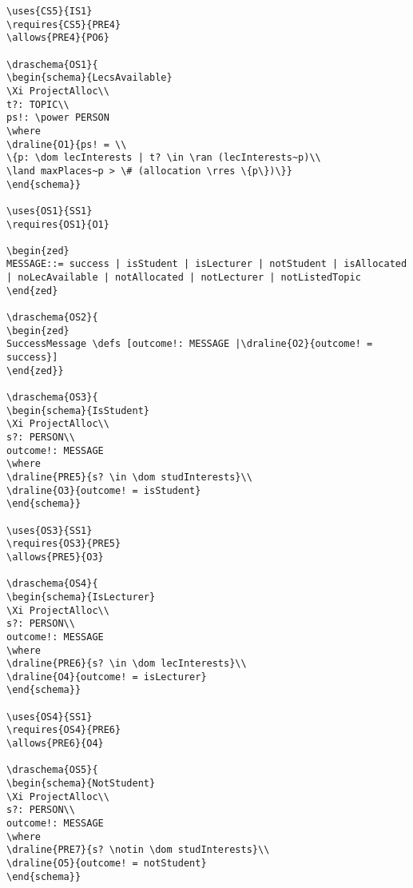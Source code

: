 \begin{verbatim}
\uses{CS5}{IS1}
\requires{CS5}{PRE4}
\allows{PRE4}{PO6}

\draschema{OS1}{
\begin{schema}{LecsAvailable}
\Xi ProjectAlloc\\
t?: TOPIC\\
ps!: \power PERSON
\where
\draline{O1}{ps! = \\
\{p: \dom lecInterests | t? \in \ran (lecInterests~p)\\
\land maxPlaces~p > \# (allocation \rres \{p\})\}}
\end{schema}}

\uses{OS1}{SS1}
\requires{OS1}{O1}

\begin{zed}
MESSAGE::= success | isStudent | isLecturer | notStudent | isAllocated | noLecAvailable | notAllocated | notLecturer | notListedTopic
\end{zed}

\draschema{OS2}{
\begin{zed}
SuccessMessage \defs [outcome!: MESSAGE |\draline{O2}{outcome! = success}]
\end{zed}}

\draschema{OS3}{
\begin{schema}{IsStudent}
\Xi ProjectAlloc\\
s?: PERSON\\
outcome!: MESSAGE
\where
\draline{PRE5}{s? \in \dom studInterests}\\
\draline{O3}{outcome! = isStudent}
\end{schema}}

\uses{OS3}{SS1}
\requires{OS3}{PRE5}
\allows{PRE5}{O3}

\draschema{OS4}{
\begin{schema}{IsLecturer}
\Xi ProjectAlloc\\
s?: PERSON\\
outcome!: MESSAGE
\where
\draline{PRE6}{s? \in \dom lecInterests}\\
\draline{O4}{outcome! = isLecturer}
\end{schema}}

\uses{OS4}{SS1}
\requires{OS4}{PRE6}
\allows{PRE6}{O4}

\draschema{OS5}{
\begin{schema}{NotStudent}
\Xi ProjectAlloc\\
s?: PERSON\\
outcome!: MESSAGE
\where
\draline{PRE7}{s? \notin \dom studInterests}\\
\draline{O5}{outcome! = notStudent}
\end{schema}}


\end{verbatim}
